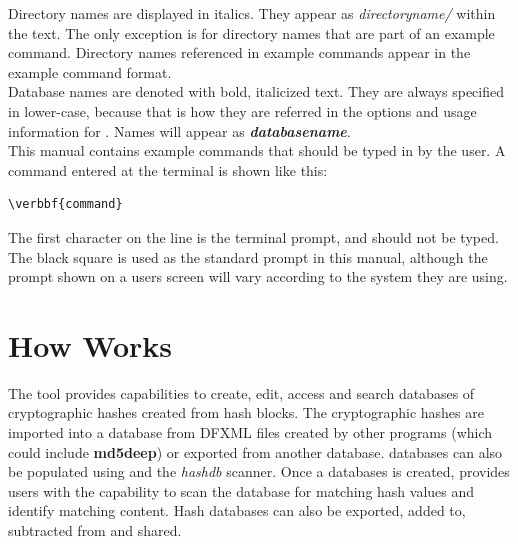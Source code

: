 \documentclass[11pt,fleqn]{article} %
\begin{document}
Directory names are displayed in italics. They appear as \textit{directoryname/} within the text. The only exception is for directory names that are part of an example command. Directory names referenced in example commands appear in the example command format.\\

Database names are denoted with bold, italicized text. They are always specified in lower-case, because that is how they are referred in the options and usage information for \hash. Names will appear as \textbf{\textit{databasename}}.\\

This manual contains example commands that should be typed in by the user. A command entered at the terminal is shown like this: \begin{Verbatim}[commandchars=\\\{\}]
\verbbf{command}
\end{Verbatim}

The first character on the line is the terminal prompt, and should not be typed. The black square is used as the standard prompt in this manual, although the prompt shown on a users screen will vary according to the system they are using.\\


\section{How \hash Works}
The \hash tool provides capabilities to create, edit, access and search databases of cryptographic hashes created from hash blocks. The cryptographic hashes are imported into a database from DFXML files created by other programs (which could include \textbf{md5deep}) or exported from another \hash database. \hash databases can also be populated using \bulk and the \textit{hashdb} scanner. Once a databases is created, \hash provides users with the capability to scan the database for matching hash values and identify matching content. Hash databases can also be exported, added to, subtracted from and shared.\\
\end{document}
